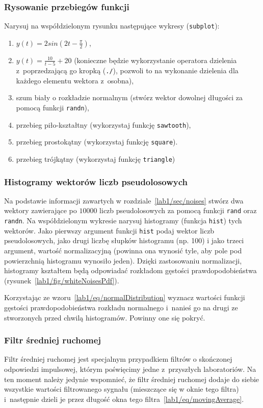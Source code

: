 \subsubsection{Rysowanie przebiegów funkcji}
Narysuj na współdzielonym rysunku następujące wykresy (\texttt{subplot}):
\begin{enumerate}
	\item $y(t) = 2sin(2t - \frac{\pi}{2})$,
	\item $y(t) = \frac{10}{t-5} + 20$ (konieczne będzie wykorzystanie operatora dzielenia z~poprzedzającą go kropką (\texttt{./}), pozwoli to na wykonanie dzielenia dla każdego elementu wektora z~osobna),
	\item szum biały o rozkładzie normalnym (stwórz wektor dowolnej długości za pomocą funkcji \texttt{randn}),
	\item przebieg piło-kształtny (wykorzystaj funkcję \texttt{sawtooth}),
	\item przebieg prostokątny (wykorzystaj funkcję \texttt{square}).
	\item przebieg trójkątny (wykorzystaj funkcję \texttt{triangle})
\end{enumerate}

\subsubsection{Histogramy wektorów liczb pseudolosowych}
Na podstawie informacji zawartych w rozdziale~\ref{lab1/sec/noises} stwórz dwa wektory zawierające po $10000$ liczb pseudolosowych za pomocą funkcji \texttt{rand} oraz \texttt{randn}. Na współdzielonym wykresie narysuj histogramy (funkcja \texttt{hist}) tych wektorów. Jako pierwszy argument funkcji \texttt{hist} podaj wektor liczb pseudolosowych, jako drugi liczbę słupków histogramu (np. 100) i jako trzeci argument, wartość normalizacyjną (powinna ona wynosić tyle, aby pole pod powierzchnią histogramu wynosiło jeden). Dzięki zastosowaniu normalizacji, histogramy kształtem będą odpowiadać rozkładom gęstości prawdopodobieństwa (rysunek~\ref{lab1/fig/whiteNoisesPdf}). 

 
Korzystając ze wzoru~\ref{lab1/eq/normalDistribution} wyznacz wartości funkcji gęstości prawdopodobieństwa rozkładu normalnego i~nanieś go na drugi ze stworzonych przed chwilą histogramów. Powinny one się pokryć. 

\subsubsection{Filtr średniej ruchomej}
Filtr średniej ruchomej jest specjalnym przypadkiem filtrów o skończonej odpowiedzi impulsowej, którym poświęcimy jedne z~przyszłych laboratoriów. Na ten moment należy jedynie wspomnieć, że filtr średniej ruchomej dodaje do siebie wszystkie wartości filtrowanego sygnału (mieszczące się w oknie tego filtra) i~następnie dzieli je przez długość okna tego filtra~\ref{lab1/eq/movingAverage}.

